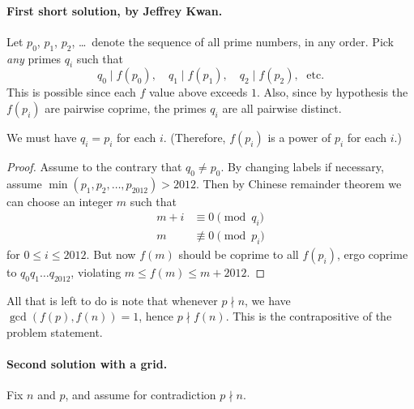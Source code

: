 \documentclass[11pt]{scrartcl}
\begin{document}
\paragraph{First short solution, by Jeffrey Kwan.}
Let $p_0$, $p_1$, $p_2$, \dots\ denote the
sequence of all prime numbers, in any order.
Pick \emph{any} primes $q_i$ such that
\[ q_0 \mid f(p_0), \quad q_1 \mid f(p_1), \quad
  q_2 \mid f(p_2), \; \text{ etc}. \]
This is possible since each $f$ value above exceeds $1$.
Also, since by hypothesis the $f(p_i)$ are pairwise coprime,
the primes $q_i$ are all pairwise distinct.

\begin{claim*}
  We must have $q_i = p_i$ for each $i$.
  (Therefore, $f(p_i)$ is a power of $p_i$ for each $i$.)
\end{claim*}
\begin{proof}
  Assume to the contrary that $q_0 \neq p_0$.
  By changing labels if necessary, assume
  $\min(p_1, p_2, \dots, p_{2012}) > 2012$.
  Then by Chinese remainder theorem we can choose
  an integer $m$ such that
  \begin{align*}
    m+i &\equiv 0 \pmod{q_i} \\
    m &\not\equiv 0 \pmod{p_i}
  \end{align*}
  for $0 \le i \le 2012$.
  But now $f(m)$ should be coprime to all $f(p_i)$,
  ergo coprime to $q_0 q_1 \dots q_{2012}$,
  violating $m \le f(m) \le m+2012$.
\end{proof}

All that is left to do is note that whenever $p \nmid n$,
we have $\gcd(f(p), f(n)) = 1$, hence $p \nmid f(n)$.
This is the contrapositive of the problem statement.


\paragraph{Second solution with a grid.}
Fix $n$ and $p$, and assume for contradiction $p \nmid n$.
\end{document}
